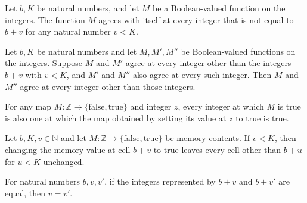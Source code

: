 \begin{lemma}
\label{Complexity.LogProg.ExpBFS.Out.refl}
\leanok
{}
Let $b,K$ be natural numbers, and let $M$ be a Boolean-valued function on the integers.
The function $M$ agrees with itself at every integer that is not equal to $b+v$ for any
natural number $v<K$.
\end{lemma}

\begin{lemma}
\label{Complexity.LogProg.ExpBFS.Out.trans}
\leanok
{}
Let $b,K$ be natural numbers and let $M,M',M''$ be Boolean-valued functions on the
integers. Suppose $M$ and $M'$ agree at every integer other than the integers $b+v$ with
$v<K$, and $M'$ and $M''$ also agree at every such integer. Then $M$ and $M''$ agree at
every integer other than those integers.
\end{lemma}

\begin{lemma}
\label{Complexity.LogProg.ExpBFS.mono_update}
\leanok
{}
For any map $M : \mathbb{Z} \to \{\mathrm{false},\mathrm{true}\}$ and integer $z$, every
integer at which $M$ is true is also one at which the map obtained by setting its value
at $z$ to true is true.
\end{lemma}

\begin{lemma}
\label{Complexity.LogProg.ExpBFS.out_update}
\leanok
{}
Let $b,K,v\in\mathbb{N}$ and let $M:\mathbb{Z}\to\{\mathrm{false},\mathrm{true}\}$ be
memory contents. If $v<K$, then changing the memory value at cell $b+v$ to true leaves
every cell other than $b+u$ for $u<K$ unchanged.
\end{lemma}

\begin{lemma}
\label{Complexity.LogProg.ExpBFS.cell_inj}
\leanok
{}
For natural numbers $b,v,v'$, if the integers represented by $b+v$ and $b+v'$ are equal,
then $v=v'$.
\end{lemma}

